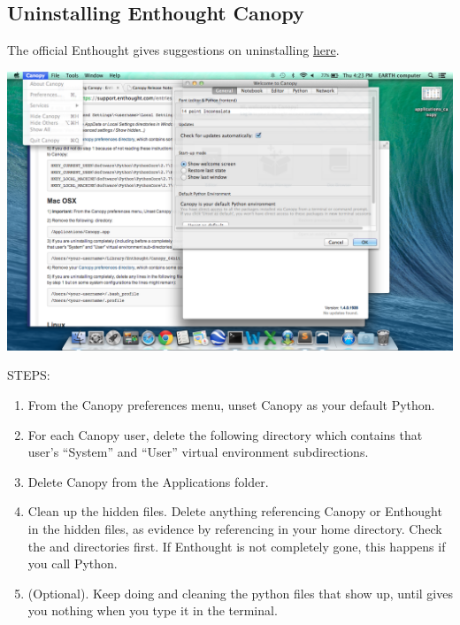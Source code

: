 \documentclass[letterpaper,10pt,english]{sphinxmanual}
\begin{document}
\subsection{Uninstalling Enthought Canopy}
\label{docfiles/install_dependencies:uninstalling-enthought-canopy}
The official Enthought gives suggestions on uninstalling \href{https://guide.macports.org/chunked/installing.macports.uninstalling.html}{here}.

\includegraphics{canopy_preferences.png}

STEPS:
\begin{enumerate}
\item {} 
From the Canopy preferences menu, unset Canopy as your default Python.

\item {} 
For each Canopy user, delete the following directory which contains that user’s ``System'' and ``User'' virtual environment subdirections.

\item {} 
Delete Canopy from the Applications folder.

\item {} 
Clean up the hidden files. Delete anything referencing Canopy or Enthought in the hidden files, as evidence by referencing  in your home directory. Check the  and  directories first. If Enthought is not completely gone, this happens if you call Python.

\item {} 
(Optional). Keep doing  and cleaning the python files that show up, until  gives you nothing when you type it in the terminal.

\end{enumerate}
\end{document}
